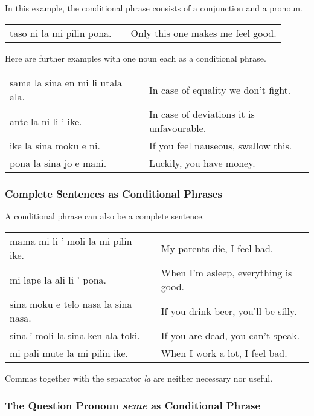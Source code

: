 In this example, the conditional phrase consists of a conjunction and a pronoun. 

\begin{supertabular}{p{5,5cm}|ll}
taso ni la mi pilin pona. && Only this one makes me feel good. \\
\end{supertabular} 

Here are further examples with one noun each as a conditional phrase.

\begin{supertabular}{p{5,5cm}|ll}
sama la sina en mi li utala ala. && In case of equality we don't fight. \\
ante la ni li ' ike. && In case of deviations it is unfavourable.  \\
ike la sina moku e ni. && If you feel nauseous, swallow this. \\
pona la sina jo e mani. && Luckily, you have money. \\
\end{supertabular} 

%
%
\subsubsection*{Complete Sentences as Conditional Phrases}
%
%
A conditional phrase can also be a complete sentence.

\begin{supertabular}{p{5,5cm}|ll}
mama mi li ' moli la mi pilin ike. && My parents die, I feel bad. \\
mi lape la ali li ' pona. && When I'm asleep, everything is good. \\
sina moku e telo nasa la sina nasa. && If you drink beer, you'll be silly. \\
sina ' moli la sina ken ala toki. && If you are dead, you can't speak. \\
mi pali mute la mi pilin ike. && When I work a lot, I feel bad. \\
\end{supertabular} 

Commas together with the separator \textit{la} are neither necessary nor useful. 

%
%
\subsubsection*{The Question Pronoun \textit{seme} as Conditional Phrase}
%
%

